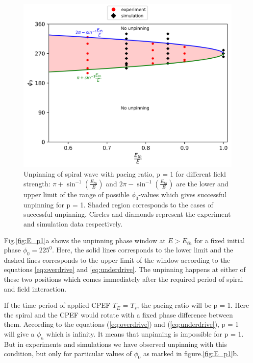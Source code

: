 \documentclass[%
 preprint,
 amsmath,amssymb,
 aps,
]{revtex4-2}
\begin{document}
\begin{figure}[H]
    \centering
    \includegraphics{p1.png}
    \caption{Unpinning of spiral wave with pacing ratio, p = 1 for different field strength: $\pi+{\sin^{-1}}{(\frac{E_{th}}{E})}$ and $2\pi-{\sin^{-1}}{(\frac{E_{th}}{E})}$ are the lower and upper limit of 
    the range of possible ${\phi}_0$-values which gives successful unpinning for p = 1. Shaded region corresponds to the cases of successful unpinning.
    Circles and diamonds represent the experiment and simulation data respectively.}
    \label{fig:unpinning_p1}
\end{figure}
\fi
Fig.\ref{fig:E_p1}a shows the unpinning phase window at $E>E_{th}$ for a fixed initial phase $\phi_0 = 225^0$. Here, the solid lines corresponds to the lower limit and the dashed lines corresponds to the upper limit of the window according to the equations \ref{eq:overdrive} and \ref{eq:underdrive}. The unpinning happens at either of these two positions which comes immediately after the required period of spiral and field interaction. 

If the time period of applied CPEF $T_E$ = $T_s$, the pacing ratio will be p = 1. Here the spiral and the CPEF would rotate with a fixed phase difference between them. According to the equations (\ref{eq:overdrive}) and (\ref{eq:underdrive}), p = 1 will give a $\phi_u$ which is infinity. It means that unpinning is impossible for p = 1. But in experiments and simulations we have observed unpinning with this condition, but only for particular values of $\phi_0$ as marked in figure.\ref{fig:E_p1}b. 
\end{document}
